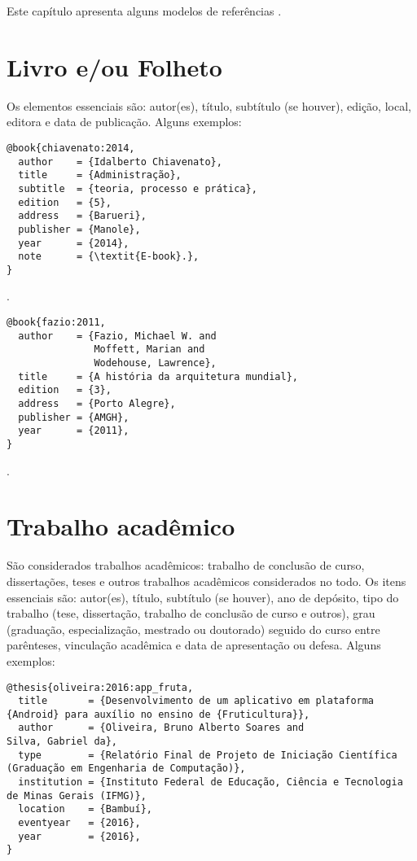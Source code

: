 Este capítulo apresenta alguns modelos de referências \cite{ifmg:2020:manual}.

\section{Livro e/ou Folheto}

Os elementos essenciais são: autor(es), título, subtítulo (se houver), edição, local, editora e data de publicação.
Alguns exemplos:

\vspace*{1em}

\begin{verbatim}
@book{chiavenato:2014,
  author    = {Idalberto Chiavenato},
  title     = {Administração},
  subtitle  = {teoria, processo e prática},
  edition   = {5},
  address   = {Barueri},
  publisher = {Manole},
  year      = {2014},
  note      = {\textit{E-book}.},
}
\end{verbatim}

\noindent
{}.

\vspace*{1em}

\begin{verbatim}
@book{fazio:2011,
  author    = {Fazio, Michael W. and
               Moffett, Marian and
               Wodehouse, Lawrence},
  title     = {A história da arquitetura mundial},
  edition   = {3},
  address   = {Porto Alegre},
  publisher = {AMGH},
  year      = {2011},
}
\end{verbatim}

\noindent
{}.

\section{Trabalho acadêmico}

São considerados trabalhos acadêmicos: trabalho de conclusão de curso, dissertações, teses e outros trabalhos acadêmicos considerados no todo.
Os itens essenciais são: autor(es), título, subtítulo (se houver), ano de depósito, tipo do trabalho (tese, dissertação, trabalho de conclusão de curso e outros), grau (graduação, especialização, mestrado ou doutorado) seguido do curso entre parênteses, vinculação acadêmica e data de apresentação ou defesa.
Alguns exemplos:

\vspace*{1em}

\begin{verbatim}
@thesis{oliveira:2016:app_fruta,
  title       = {Desenvolvimento de um aplicativo em plataforma {Android} para auxílio no ensino de {Fruticultura}},
  author      = {Oliveira, Bruno Alberto Soares and
Silva, Gabriel da},
  type        = {Relatório Final de Projeto de Iniciação Científica (Graduação em Engenharia de Computação)},
  institution = {Instituto Federal de Educação, Ciência e Tecnologia de Minas Gerais (IFMG)},
  location    = {Bambuí},
  eventyear   = {2016},
  year        = {2016},
}
\end{verbatim}


